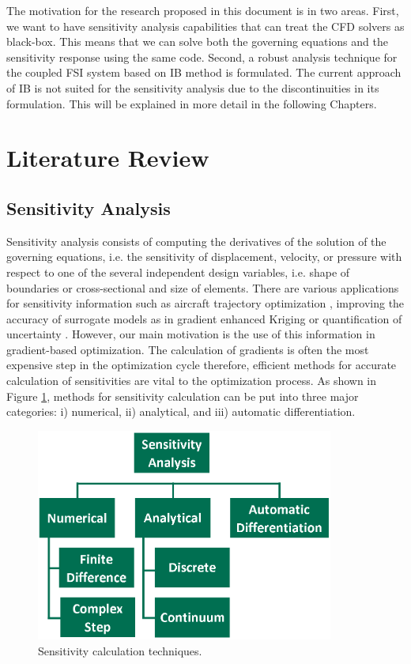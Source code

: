 The motivation for the research proposed in this document is in two areas. First, we want to have sensitivity analysis capabilities that can treat the CFD solvers as black-box. This means that we can solve both the governing equations and the sensitivity response using the same code. Second, a robust analysis technique for the coupled FSI system based on IB method is formulated. The current approach of IB is not suited for the sensitivity analysis due to the discontinuities in its formulation. This will be explained in more detail in the following Chapters.

\section{Literature Review}
\subsection{Sensitivity Analysis}
Sensitivity analysis consists of computing the derivatives of the solution of the governing equations, i.e. the sensitivity of displacement, velocity, or pressure with respect to one of the several independent design variables, i.e. shape of boundaries or cross-sectional and size of elements. There are various applications for sensitivity information such as aircraft trajectory optimization \cite{sridhar2011aircraft}, improving the accuracy of surrogate models as in gradient enhanced Kriging \cite{han2013improving} or quantification of uncertainty \cite{pettit2004uncertainty}. However, our main motivation is the use of this information in gradient-based optimization. The calculation of gradients is often the most expensive step in the optimization cycle therefore, efficient methods for accurate calculation of sensitivities are vital to the optimization process. As shown in Figure \ref{fig:C1_sensitivityTaxonomy}, methods for sensitivity calculation can be put into three major categories: i) numerical, ii) analytical, and iii) automatic differentiation.

\begin{figure}[H]
	\centering
	\includegraphics[height=7.00cm]{Chapter_1/figure/sensitivity_taxonomy.png}
	\caption{Sensitivity calculation techniques.}
	\label{fig:C1_sensitivityTaxonomy}
\end{figure}

